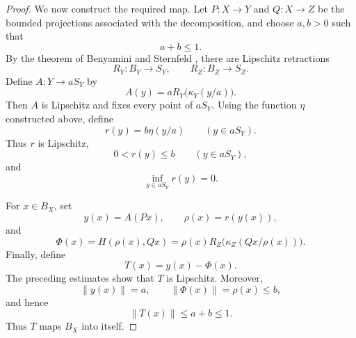 \documentclass[11pt,reqno]{amsart}
\theoremstyle{plain}
\theoremstyle{definition}
\begin{document}
\begin{proof}
We now construct the required map. Let $P\colon X\to Y$ and $Q\colon X\to Z$ be the bounded projections associated with the decomposition, and choose $a,b>0$ such that
\begin{equation*}
 a+b\leq1.
\end{equation*}
By the theorem of Benyamini and Sternfeld \cite{BenyaminiSternfeld1983}, there are Lipschitz retractions
\begin{equation*}
 R_Y\colon B_Y\to S_Y,
 \qquad
 R_Z\colon B_Z\to S_Z.
\end{equation*}
Define $A\colon Y\to aS_Y$ by
\begin{equation*}
 A(y)=aR_Y\bigl(\kappa_Y(y/a)\bigr).
\end{equation*}
Then $A$ is Lipschitz and fixes every point of $aS_Y$. Using the function $\eta$ constructed above, define
\begin{equation*}
 r(y)=b\eta(y/a)
 \qquad(y\in aS_Y).
\end{equation*}
Thus $r$ is Lipschitz,
\begin{equation*}
 0<r(y)\leq b \qquad(y\in aS_Y),
\end{equation*}
and
\begin{equation*}
 \inf_{y\in aS_Y}r(y)=0.
\end{equation*}

For $x\in B_X$, set
\begin{equation*}
 y(x)=A(Px),
 \qquad
 \rho(x)=r(y(x)),
\end{equation*}
and
\begin{equation*}
 \Phi(x)
 =H(\rho(x),Qx)
 =\rho(x)R_Z\bigl(\kappa_Z(Qx/\rho(x))\bigr).
\end{equation*}
Finally, define
\begin{equation*}
 T(x)=y(x)-\Phi(x).
\end{equation*}
The preceding estimates show that $T$ is Lipschitz. Moreover,
\begin{equation*}
 \|y(x)\|=a,
 \qquad
 \|\Phi(x)\|=\rho(x)\leq b,
\end{equation*}
and hence
\begin{equation*}
 \|T(x)\|\leq a+b\leq1.
\end{equation*}
Thus $T$ maps $B_X$ into itself.


\end{proof}
\end{document}
